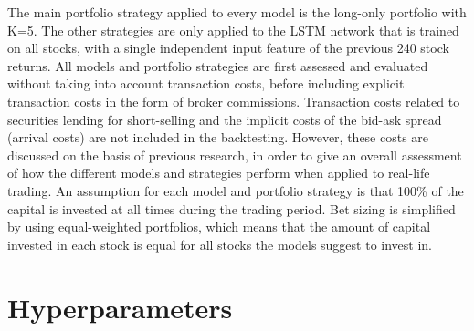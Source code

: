 \indent \newline
The main portfolio strategy applied to every model is the long-only portfolio with K=5. The other strategies are only applied to the LSTM network that is trained on all stocks, with a single independent input feature of the previous 240 stock returns. All models and portfolio strategies are first assessed and evaluated without taking into account transaction costs, before including explicit transaction costs in the form of broker commissions. Transaction costs related to securities lending for short-selling and the implicit costs of the bid-ask spread (arrival costs) are not included in the backtesting. However, these costs are discussed on the basis of previous research, in order to give an overall assessment of how the different models and strategies perform when applied to real-life trading. An assumption for each model and portfolio strategy is that 100\% of the capital is invested at all times during the trading period. Bet sizing is simplified by using equal-weighted portfolios, which means that the amount of capital invested in each stock is equal for all stocks the models suggest to invest in. 

\section{Hyperparameters}